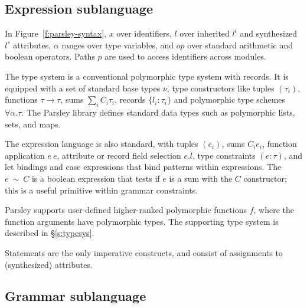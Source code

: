 \documentclass[letterpaper]{article}
\newcommand{\utv}{\alpha}             %
\begin{document}
\subsection*{Expression sublanguage}
\label{ss:lang:expr}

In Figure~\ref{f:parsley-syntax}, $x$ over identifiers, $l$ over
inherited $l^i$ and synthesized $l^s$ attributes, $\utv$ ranges over
type variables, and $op$ over standard arithmetic and boolean
operators.  Paths $p$ are used to access identifiers across modules.

The type system is a conventional polymorphic type system
with records.  It is equipped with a set of standard base types $\nu$, type
constructors like tuples $(\tau_i)$, functions $\tau\rightarrow\tau$,
sums $\sum_iC_i\tau_i$, records $\{l_i:\tau_i\}$ and
polymorphic type schemes $\forall\utv.\tau$.  The Parsley library
defines standard data types such as polymorphic lists, sets, and maps.

The expression language is also standard, with tuples $(e_i)$, sums
$C_i e_i$, function application $e\ e$, attribute or record field
selection $e.l$, type constraints $(e:\tau)$, and let bindings and
case expressions that bind patterns within expressions.  The
$e\ \sim\ C$ is a boolean expression that tests if $e$ is a sum with
the $C$ constructor; this is a useful primitive within grammar
constraints.

Parsley supports user-defined higher-ranked polymorphic functions $f$,
where the function arguments have polymorphic types.  The supporting
type system is described in \S\ref{s:typesys}.

Statements are the only imperative constructs, and consist of
assignments to (synthesized) attributes.

\subsection*{Grammar sublanguage}
\label{ss:lang:grammar}
\end{document}

